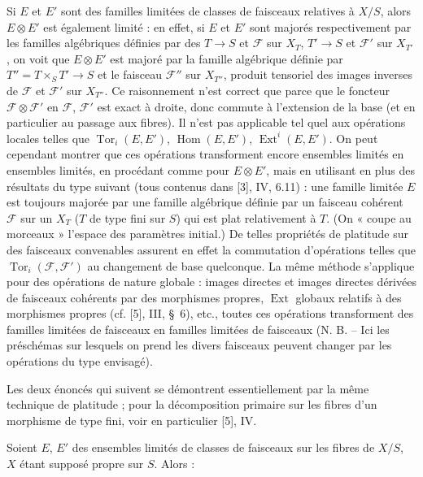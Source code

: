 Si $E$ et $E'$ sont des familles limitées de classes de faisceaux relatives à
$X/S$, alors $E\otimes E'$ est également limité : en effet, si $E$ et $E'$ sont
majorés respectivement par les familles algébriques définies par des
$T\longrightarrow S$ et $\mathcal F$ sur $X_T$, $T'\longrightarrow S$ et
$\mathcal F'$ sur $X_{T'}$, on voit que $E\otimes E'$ est majoré par la famille
algébrique définie par $T''=T\times_S T'\longrightarrow S$ et le faisceau
$\mathcal F''$ sur $X_{T''}$, produit tensoriel des images inverses de
$\mathcal F$ et $\mathcal F'$ sur $X_{T''}$. Ce raisonnement n'est correct que
parce que le foncteur $\mathcal F\otimes\mathcal F'$ en $\mathcal F$,
$\mathcal F'$ est exact à droite, donc commute à l'extension de la base (et en
particulier au passage aux fibres). Il n'est pas applicable tel quel aux
opérations locales telles que $\operatorname{Tor}_i(E,E')$,
$\operatorname{Hom}(E,E')$, $\operatorname{Ext}^i(E,E')$. On peut cependant
montrer que ces opérations transforment encore ensembles limités en ensembles
limités, en procédant comme pour $E\otimes E'$, mais en utilisant en plus des
résultats du type suivant (tous contenus dans [3], IV, 6.11) : une famille
limitée $E$ est toujours majorée par une famille algébrique définie par un
faisceau cohérent $\mathcal F$ sur un $X_T$ ($T$ de type fini sur $S$) qui est
plat relativement à $T$. (On « coupe au morceaux » l'espace des paramètres
initial.) De telles
propriétés de platitude sur des faisceaux convenables assurent en effet la
commutation d'opérations telles que $\operatorname{Tor}_i(\mathcal F,\mathcal
F')$ au changement de base quelconque. La même méthode s'applique pour des
opérations de nature globale : images directes et images directes dérivées de
faisceaux cohérents par des morphismes propres, $\operatorname{Ext}$ globaux
relatifs à des morphismes propres (cf. [5], III, \S~6), etc., toutes ces
opérations transforment des familles limitées de faisceaux en familles limitées
de faisceaux (N. B. -- Ici les préschémas sur lesquels on prend les divers
faisceaux peuvent changer par les opérations du type envisagé).

Les deux énoncés qui suivent se démontrent essentiellement par la même
technique de platitude ; pour la décomposition primaire sur les fibres d'un
morphisme de type fini, voir en particulier [5], IV.

 Soient $E$, $E'$ des ensembles limités de classes de
faisceaux sur les fibres de $X/S$, $X$ étant supposé propre sur $S$. Alors :

